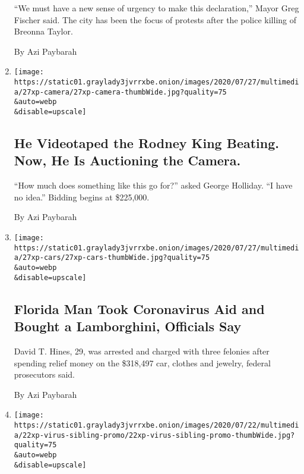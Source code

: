 \begin{enumerate}
  ``We must have a new sense of urgency to make this declaration,''
  Mayor Greg Fischer said. The city has been the focus of protests after
  the police killing of Breonna Taylor.

  By Azi Paybarah
\item
  \href{/2020/07/29/us/rodney-king-video-camera-auction.html}{}

  \texttt{[image: https://static01.graylady3jvrrxbe.onion/images/2020/07/27/multimedia/27xp-camera/27xp-camera-thumbWide.jpg?quality=75\\\&auto=webp\\\&disable=upscale]}

  \hypertarget{he-videotaped-the-rodney-king-beating-now-he-is-auctioning-the-camera}{%
  \subsection{He Videotaped the Rodney King Beating. Now, He Is
  Auctioning the
  Camera.}\label{he-videotaped-the-rodney-king-beating-now-he-is-auctioning-the-camera}}

  ``How much does something like this go for?'' asked George Holliday.
  ``I have no idea.'' Bidding begins at \$225,000.

  By Azi Paybarah
\item
  \href{/2020/07/27/us/lamborghini-ppp-covid-19.html}{}

  \texttt{[image: https://static01.graylady3jvrrxbe.onion/images/2020/07/27/multimedia/27xp-cars/27xp-cars-thumbWide.jpg?quality=75\\\&auto=webp\\\&disable=upscale]}

  \hypertarget{florida-man-took-coronavirus-aid-and-bought-a-lamborghini-officials-say}{%
  \subsection{Florida Man Took Coronavirus Aid and Bought a Lamborghini,
  Officials
  Say}\label{florida-man-took-coronavirus-aid-and-bought-a-lamborghini-officials-say}}

  David T. Hines, 29, was arrested and charged with three felonies after
  spending relief money on the \$318,497 car, clothes and jewelry,
  federal prosecutors said.

  By Azi Paybarah
\item
  \href{/2020/07/22/us/florida-mother-2-children-covid-19.html}{}

  \texttt{[image: https://static01.graylady3jvrrxbe.onion/images/2020/07/22/multimedia/22xp-virus-sibling-promo/22xp-virus-sibling-promo-thumbWide.jpg?quality=75\\\&auto=webp\\\&disable=upscale]}


\end{enumerate}
